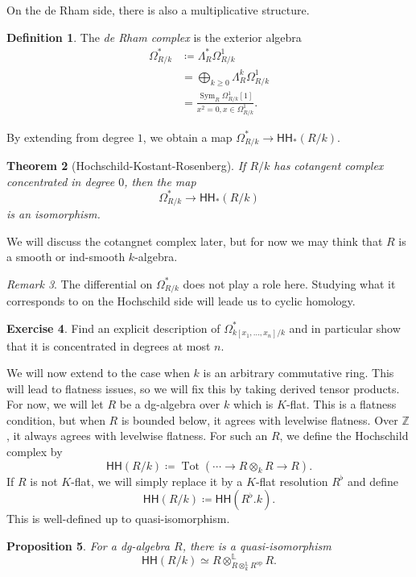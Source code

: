 \documentclass[10pt, oneside]{memoir}
\newtheorem{thm}{Theorem}[subsection]
\newtheorem{prop}[thm]{Proposition}
\theoremstyle{definition}
\newtheorem{defn}[thm]{Definition}
\newtheorem{exer}[thm]{Exercise}
\theoremstyle{remark}
\newtheorem{rmk}[thm]{Remark}
\theoremstyle{plain}
\theoremstyle{definition}
\theoremstyle{remark}
\newcommand{\Z}{\mathbb{Z}}
\renewcommand{\L}{\mathbb{L}}
\newcommand{\mr}[1]{\mathrm{#1}}
\newcommand{\ms}[1]{\mathsf{#1}}
\newcommand{\1}{\mathbf{1}}
\newcommand{\2}{\mathbf{2}}
\newcommand{\3}{\mathbf{3}}
\newcommand{\HH}{\ms{HH}}
\DeclareMathOperator{\Sym}{Sym}
\DeclareMathOperator{\Tot}{Tot}
\begin{document}
On the de Rham side, there is also a multiplicative structure.
\begin{defn}
    The \textit{de Rham complex} is the exterior algebra
    \begin{align*}
        \Omega^*_{R/k} &\coloneqq \Lambda_R^* \Omega^1_{R/k} \\
        &= \bigoplus_{k \geq 0} \Lambda_R^k \Omega^1_{R/k} \\
        &= \frac{\Sym_R \Omega^1_{R/k}[1]}{x^2 = 0, x \in \Omega^1_{R/k}}.
    \end{align*}
\end{defn}

By extending from degree $1$, we obtain a map $\Omega^*_{R/k} \to \HH_*(R/k)$.

\begin{thm}[Hochschild-Kostant-Rosenberg]\label{thm:hkr}
    If $R/k$ has cotangent complex concentrated in degree $0$, then the map
    \[ \Omega^*_{R/k} \to \HH_*(R/k) \]
    is an isomorphism.
\end{thm}

We will discuss the cotangnet complex later, but for now we may think that $R$ is a smooth or ind-smooth $k$-algebra.

\begin{rmk}
    The differential on $\Omega^*_{R/k}$ does not play a role here. Studying what it corresponds to on the Hochschild side will leade us to cyclic homology.
\end{rmk}

\begin{exer}
    Find an explicit description of $\Omega^*_{k[x_1, \ldots, x_n]/k}$ and in particular show that it is concentrated in degrees at most $n$.
\end{exer}

We will now extend to the case when $k$ is an arbitrary commutative ring. This will lead to flatness issues, so we will fix this by taking derived tensor products. For now, we will let $R$ be a dg-algebra over $k$ which is $K$-flat. This is a flatness condition, but when $R$ is bounded below, it agrees with levelwise flatness. Over $\Z$, it always agrees with levelwise flatness. For such an $R$, we define the Hochschild complex by
\[ \HH(R/k) \coloneqq \Tot(\cdots \to R \otimes_k R \to R). \]
If $R$ is not $K$-flat, we will simply replace it by a $K$-flat resolution $R^{\flat}$ and define
\[ \HH(R/k) \coloneqq \HH(R^{\flat}.k). \]
This is well-defined up to quasi-isomorphism.

\begin{prop}
    For a dg-algebra $R$, there is a quasi-isomorphism
    \[ \HH(R/k) \simeq R \otimes_{R \otimes_k^{\L} R^{\mr{op}}}^{\L} R. \]
\end{prop}
\end{document}
